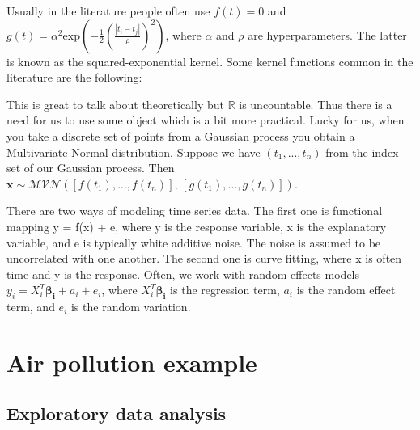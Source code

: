 \documentclass[a4paper, 10pt]{article}
\begin{document}
\begin{flushleft}
   \vspace{1em}
   
   Usually in the literature people often use $f(t) = 0$ and $g(t) = \alpha^{2} \text{exp}(- \frac{1}{2} (\frac{|t_i - t_j|}{\rho})^2)$, where $\alpha$ and $\rho$ are hyperparameters. The latter is known as the squared-exponential kernel. Some kernel functions common in the literature are the following:

   \vspace{1em}
   
   This is great to talk about theoretically but $\mathbb{R}$ is uncountable. Thus there is a need for us to use some object which is a bit more practical. Lucky for us, when you take a discrete set of points from a Gaussian process you obtain a Multivariate Normal distribution. Suppose we have $(t_{1}, ..., t_{n})$ from the index set of our Gaussian process. Then $\mathbf{x} \sim \mathcal{MVN}([f(t_{1}), ..., f(t_{n})], \, [g(t_{1}), ..., g(t_{n})])$.

   \vspace{1em}
   
   There are two ways of modeling time series data. The first one is functional mapping y = f(x) + e, where y is the response variable, x is the explanatory variable, and e is typically white additive noise. The noise is assumed to be uncorrelated with one another. The second one is curve fitting, where x is often time and y is the response. Often, we work with random effects models $y_{i} = X_{i}^{T} \boldsymbol{\beta_{i}} + a_{i} + e_{i}$, where $X_{i}^{T} \boldsymbol{\beta_{i}}$ is the regression term, $a_{i}$ is the random effect term, and $e_{i}$ is the random variation.

   \section*{Air pollution example}
   \subsection*{Exploratory data analysis}
   

\end{flushleft}
\end{document}
